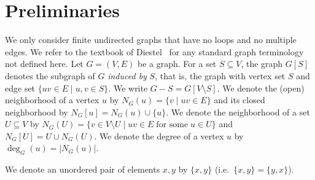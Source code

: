 \documentclass{llncs}
\newcommand{\ie}{i.e.~}
\begin{document}
\section{Preliminaries}\label{s-pre}
We only consider finite undirected graphs that have no loops and no multiple edges. 
We refer to the textbook of Diestel~\cite{Di05} for any standard graph terminology not defined here. Let $G=(V,E)$ be a graph. 
For a set $S\subseteq V$, the graph $G[S]$ denotes the subgraph of $G$ {\it induced by} $S$, that is, the graph with vertex set $S$ and edge set $\{uv \in E \mid  u,v\in S\}$.  We write $G-S=G[V\setminus S]$. 
We denote the (open) neighborhood of a vertex $u$ by $N_G(u)=\{v \mid uv\in E\}$ and its closed neighborhood by $N_G[u]=N_G(u)\cup \{u\}$.
We denote the neighborhood of a set $U\subseteq V$ by $N_G(U)=\{v\in V\setminus U \mid  uv\in E\; \mbox{for some}\; u\in U\}$ and $N_G[U]=U\cup N_G(U)$. 
We denote the degree of a vertex $u$ by $\deg_G(u)=|N_G(u)|$.

We denote an unordered pair of elements $x,y$ by $\{x,y\}$  (\ie $\{x,y\}=\{y,x\}$).
\end{document}
